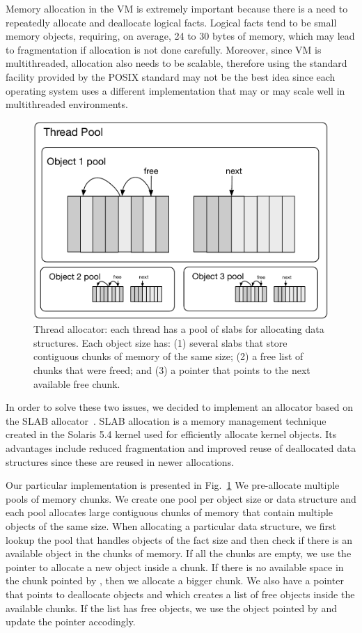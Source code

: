 
Memory allocation in the VM is extremely important because there is a need to
repeatedly allocate and deallocate logical facts. Logical facts tend to be small
memory objects, requiring, on average, 24 to 30 bytes of memory, which may lead
to fragmentation if allocation is not done carefully.  Moreover, since VM is
multithreaded, allocation also needs to be scalable, therefore using the
standard  facility provided by the POSIX standard may not be the
best idea since each operating system uses a different implementation that may
or may scale well in multithreaded environments.

\begin{figure}[ht]
   \begin{center}
      \includegraphics[width=0.7\linewidth]{figures/implementation/pool.pdf}
   \end{center}
   \caption{Thread allocator: each thread has a pool of slabs for allocating
      data structures. Each object size has: (1) several slabs that store contiguous chunks of
      memory of the same size; (2) a free list  of chunks that were freed; and (3) a  pointer that points to the next available free chunk.}
   \label{fig:implementation:pool}
\end{figure}

In order to solve these two issues, we decided to implement an allocator based
on the SLAB allocator~\cite{Bonwick-94}. SLAB allocation is a memory management
technique created in the Solaris 5.4 kernel used for efficiently allocate kernel
objects. Its advantages include reduced fragmentation and improved reuse of
deallocated data structures since these are reused in newer allocations.

Our particular implementation is presented in Fig.~\ref{fig:implementation:pool}
We pre-allocate multiple pools of memory chunks. We create one pool per object
size or data structure and each pool allocates large contiguous chunks of memory
that contain multiple objects of the same size. When allocating a particular
data structure, we first lookup the pool that
handles objects of the fact size and then check if there is an available object
in the chunks of memory. If all the chunks are empty, we use the 
pointer to allocate a new object inside a chunk. If there is no available space
in the chunk pointed by , then we allocate a bigger chunk. We also
have a pointer  that points to deallocate objects and which creates a
list of free objects inside the available chunks. If the list has free objects,
we use the object pointed by  and update the  pointer
accodingly.

